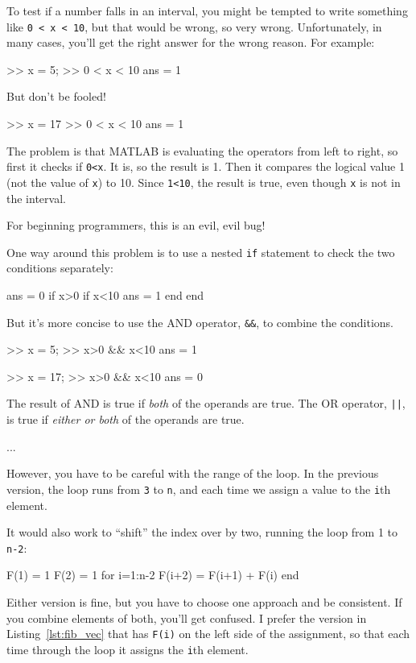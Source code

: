 
To test if a number falls in an interval, you might be
tempted to write something like {\tt 0 < x < 10}, but that
would be wrong, so very wrong.  Unfortunately, in many cases,
you'll get the right answer for the wrong reason.  For
example:

\begin{code}
>> x = 5;
>> 0 < x < 10            %
ans = 1
\end{code}

But don't be fooled!

\begin{code}
>> x = 17
>> 0 < x < 10            %
ans = 1
\end{code}

The problem is that MATLAB is evaluating the operators from left
to right, so first it checks if {\tt 0<x}.  It is, so the result
is 1.  Then it compares the logical value 1 (not the value of
{\tt x}) to 10.  Since {\tt 1<10}, the result is true, even though
{\tt x} is not in the interval.

For beginning programmers, this is an evil, evil bug!


One way around this problem is to use a nested {\tt if} statement to
check the two conditions separately:

\begin{code}
ans = 0
if x>0
    if x<10
        ans = 1
    end
end
\end{code}

But it's more concise to use the AND operator, {\tt \&\&}, to combine the conditions.

\begin{code}
>> x = 5;
>> x>0 && x<10
ans = 1

>> x = 17;
>> x>0 && x<10
ans = 0
\end{code}

The result of AND is true if {\em both} of the operands are
true.  The OR operator, {\tt ||}, is true if {\em either or both}
of the operands are true.



...




However, you have to be careful with the range of the loop.
In the previous version, the loop runs from {\tt 3} to {\tt n},
and each time we assign a value to the {\tt i}th element.  

It would also work to ``shift'' the index over by two, running the loop from 1 to {\tt n-2}:

\begin{code}
F(1) = 1
F(2) = 1
for i=1:n-2
    F(i+2) = F(i+1) + F(i)
end
\end{code}

Either version is fine, but you have to choose one approach
and be consistent.  If you combine elements of both, you'll
get confused.  I prefer the version in Listing~\ref{lst:fib_vec} that has {\tt F(i)} on the
left side of the assignment, so that each time through the loop
it assigns the {\tt i}th element.